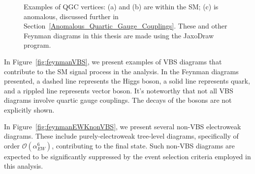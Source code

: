 \begin{figure}[tbp]
\centering
{}
\hfill
{}
\hfill
{}
\caption{Examples of QGC vertices: (a) and (b) are within the SM; (c) is anomalous, discussed further in Section~\ref{Anomalous_Quartic_Gauge_Couplings}. These and other Feynman diagrams in this thesis are made using the JaxoDraw~\cite{Binosi:2003yf} program.}
\label{fig:qgc_vertex}
\end{figure}

In Figure~\ref{fig:feynmanVBS}, we present examples of VBS diagrams that contribute to the SM signal process in the analysis. 
In the Feynman diagrams presented, a dashed line represents the Higgs boson, a solid line represents quark, and a rippled line represents vector boson.
It's noteworthy that not all VBS diagrams involve quartic gauge couplings. The decays of the bosons are not explicitly shown.

In Figure~\ref{fig:feynmanEWKnonVBS}, we present several non-VBS electroweak diagrams. These include purely-electroweak tree-level diagrams, specifically of order $\mathcal{O}(\alpha_{EW}^6)$, contributing to the final state. Such non-VBS diagrams are expected to be significantly suppressed by the event selection criteria employed in this analysis.

